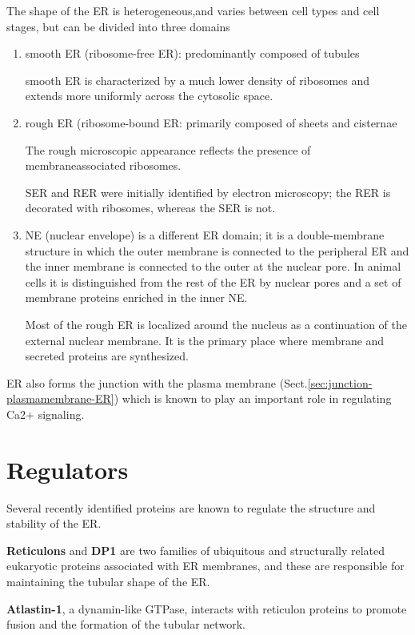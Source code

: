 The shape of the ER is heterogeneous,and varies between cell types and
cell stages, but can be divided into three domains
\begin{enumerate}
  \item smooth ER (ribosome-free ER): predominantly composed of tubules

smooth ER is characterized by a much lower density of ribosomes and extends more
uniformly across the cytosolic space.
  
  \item rough ER (ribosome-bound ER: primarily composed of sheets and cisternae
  
  The rough microscopic appearance reflects the presence of membraneassociated
  ribosomes.

  SER and RER were initially identified by electron microscopy; the RER is
  decorated with ribosomes, whereas the SER is not.

  \item NE (nuclear envelope) is a different ER domain; it is a double-membrane
structure in which the outer membrane is connected to the peripheral ER and the
inner membrane is connected to the outer at the nuclear pore. In animal cells it
is distinguished from the rest of the ER by nuclear pores and a set of membrane
proteins enriched in the inner NE.

Most of the rough ER is localized around the nucleus as a continuation of the external
nuclear membrane. It is the primary place where membrane and secreted proteins are
synthesized.
\end{enumerate}

ER also forms the junction with the plasma membrane
(Sect.\ref{sec:junction-plasmamembrane-ER}) which is known to play an important
role in regulating Ca2+ signaling.

\section{Regulators}

Several recently identified proteins are known to regulate
the structure and stability of the ER.

{\bf Reticulons} and {\bf DP1} are two families of ubiquitous and
structurally related eukaryotic proteins associated with
ER membranes, and these are responsible for maintaining
the tubular shape of the ER.

{\bf Atlastin-1}, a dynamin-like GTPase, interacts with reticulon proteins to
promote fusion and the formation of the tubular network.

